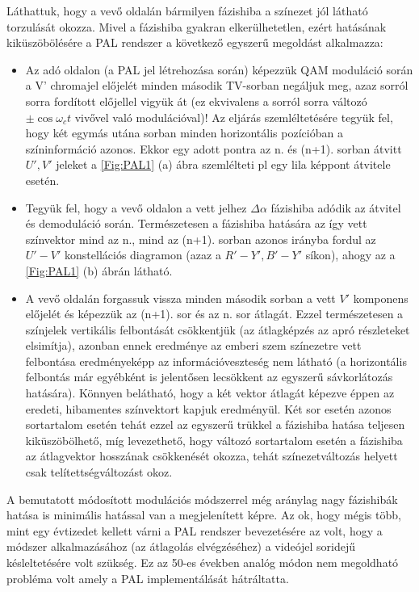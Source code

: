 Láthattuk, hogy a vevő oldalán bármilyen fázishiba a színezet jól látható torzulását okozza.
Mivel a fázishiba gyakran elkerülhetetlen, ezért hatásának kiküszöbölésére a PAL rendszer a következő egyszerű megoldást alkalmazza:
\begin{itemize}
\item Az adó oldalon (a PAL jel létrehozása során) képezzük QAM moduláció során a V' chromajel előjelét minden második TV-sorban negáljuk meg, azaz sorról sorra fordított előjellel vigyük át (ez ekvivalens a sorról sorra változó $\pm \cos \omega_c t$ vivővel való modulációval)!
Az eljárás szemléltetésére tegyük fel, hogy két egymás utána sorban minden horizontális pozícióban a színinformáció azonos.
Ekkor egy adott pontra az n. és (n+1). sorban átvitt $U',V'$ jeleket a \ref{Fig:PAL1} (a) ábra szemlélteti pl egy lila képpont átvitele esetén.
\item Tegyük fel, hogy a vevő oldalon a vett jelhez $\Delta \alpha$ fázishiba adódik az átvitel és demoduláció során.
Természetesen a fázishiba hatására az így vett színvektor mind az n., mind az (n+1). sorban azonos irányba fordul az $U'-V'$ konstellációs diagramon (azaz a $R'-Y', B'-Y'$ síkon), ahogy az a \ref{Fig:PAL1} (b) ábrán látható.
\item A vevő oldalán forgassuk vissza minden második sorban a vett $V'$ komponens előjelét és képezzük az (n+1). sor és az n. sor átlagát.
Ezzel természetesen a színjelek vertikális felbontását csökkentjük (az átlagképzés az apró részleteket elsimítja), azonban ennek eredménye az emberi szem színezetre vett felbontása eredményeképp az információveszteség nem látható (a horizontális felbontás már egyébként is jelentősen lecsökkent az egyszerű sávkorlátozás hatására).
Könnyen belátható, hogy a két vektor átlagát képezve éppen az eredeti, hibamentes színvektort kapjuk eredményül.
Két sor esetén azonos sortartalom esetén tehát ezzel az egyszerű trükkel a fázishiba hatása teljesen kiküszöbölhető, míg levezethető, hogy változó sortartalom esetén a fázishiba az átlagvektor hosszának csökkenését okozza, tehát színezetváltozás helyett csak telítettségváltozást okoz.
\end{itemize}
A bemutatott módosított modulációs módszerrel még aránylag nagy fázishibák hatása is minimális hatással van a megjelenített képre.
Az ok, hogy mégis több, mint egy évtizedet kellett várni a PAL rendszer bevezetésére az volt, hogy a módszer alkalmazásához (az átlagolás elvégzéséhez) a videójel soridejű késleltetésére volt szükség.
Ez az 50-es években analóg módon nem megoldható probléma volt amely a PAL implementálását hátráltatta.


